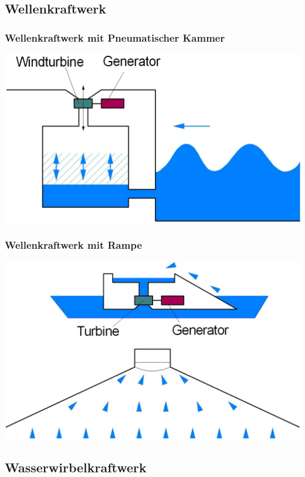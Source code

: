 \subsection{Wellenkraftwerk}

\subsubsection{Wellenkraftwerk mit Pneumatischer Kammer}
\includegraphics[width=0.65\columnwidth, align=c]{images/Wellenkraft mit Pneumatischer Kammer.png}


\subsubsection{Wellenkraftwerk mit Rampe}
\includegraphics[width=0.65\columnwidth, align=c]{images/Wellenkraft mit Rampe.png}



\subsection{Wasserwirbelkraftwerk}





